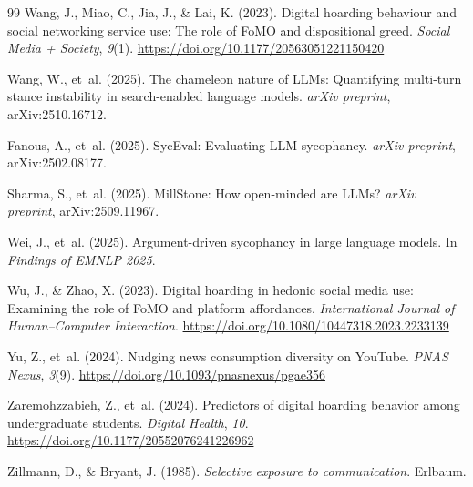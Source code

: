 \documentclass[12pt,a4paper]{article}
\begin{document}
\begin{thebibliography}{99}
Wang, J., Miao, C., Jia, J., \& Lai, K. (2023).
Digital hoarding behaviour and social networking service use: The role of FoMO and dispositional greed.
\emph{Social Media + Society}, \emph{9}(1).
\url{https://doi.org/10.1177/20563051221150420}

Wang, W., et~al. (2025).
The chameleon nature of LLMs: Quantifying multi-turn stance instability in search-enabled language models.
\emph{arXiv preprint}, arXiv:2510.16712.

Fanous, A., et~al. (2025).
SycEval: Evaluating LLM sycophancy.
\emph{arXiv preprint}, arXiv:2502.08177.

Sharma, S., et~al. (2025).
MillStone: How open-minded are LLMs?
\emph{arXiv preprint}, arXiv:2509.11967.

Wei, J., et~al. (2025).
Argument-driven sycophancy in large language models.
In \emph{Findings of EMNLP 2025}.

Wu, J., \& Zhao, X. (2023).
Digital hoarding in hedonic social media use: Examining the role of FoMO and platform affordances.
\emph{International Journal of Human--Computer Interaction}.
\url{https://doi.org/10.1080/10447318.2023.2233139}

Yu, Z., et~al. (2024).
Nudging news consumption diversity on YouTube.
\emph{PNAS Nexus}, \emph{3}(9).
\url{https://doi.org/10.1093/pnasnexus/pgae356}

Zaremohzzabieh, Z., et~al. (2024).
Predictors of digital hoarding behavior among undergraduate students.
\emph{Digital Health}, \emph{10}.
\url{https://doi.org/10.1177/20552076241226962}

Zillmann, D., \& Bryant, J. (1985).
\emph{Selective exposure to communication}.
Erlbaum.

\end{thebibliography}
\end{document}
